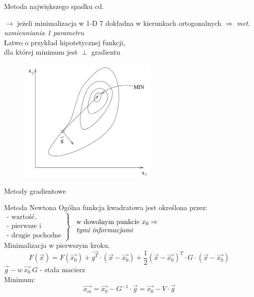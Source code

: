   \begin{frame}{Metoda największego spadku cd.}

    \begin{block}{}
      $\rightarrow$ jeżeli minimalizacja w 1-D 7 dokładna w kierunkach ortogonalnych
      $\Rightarrow$ \emph{met. uzmienniania 1 parametru}
      \smallskip
      \\Łatwo o przykład hipotetycznej funkcji,
      \\ dla której  minimum jest $\perp$ gradientu
  	\end{block}
    \begin{figure}
		\centering
		\includegraphics[height=0.5\textheight ,width=0.6\textwidth]{img/17/high_fall_met_2}
	\end{figure}

  \end{frame}

  \begin{frame}{Metody gradientowe}

    \begin{block}{Metoda Newtona}
      Ogólna funkcja kwadratowa jest określona przez:
      \\$\left.
        \begin{array}{l}
          \text{- wartość,} \\
          \text{- pierwsze i} \\
          \text{- drugie pochodne}
	    \end{array}
	  \right\}$
	  $\begin{array}{l} \text{w dowolnym punkcie } x_0 \Rightarrow \\ \text{\emph{tymi informacjami}} \end{array}$
	  \smallskip
	  \\Minimalizacja w pierwszym kroku.
	  \begin{displaymath}
	  		F(\vec{x}) = F(\vec{x_0}) + \vec{g^T} \cdot (\vec{x} - \vec{x_0}) +
	  		\frac{1}{2} (\vec{x} - \vec{x_0})^T \cdot G \cdot (\vec{x} - \vec{x_0})
	  \end{displaymath}
	  $\vec{g} - w \ \vec{x_0} \ G$ -  stała macierz
	  \smallskip
	  \\Minimum:
	  \begin{displaymath}
	  		\vec{x_m} = \vec{x_0} - G^{-1} \cdot \vec{g} =  \vec{x_0} - V \cdot \vec{g}
	  \end{displaymath}
	\end{block}

  \end{frame}

